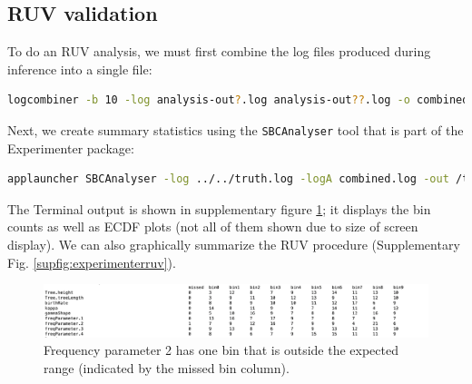 \documentclass[oneside]{article}
\begin{document}
\subsection{RUV validation}

To do an RUV analysis, we must first combine the log files produced during inference into a single file:

\vspace{.25cm}

{\scriptsize
\begin{lstlisting}[language=bash]
logcombiner -b 10 -log analysis-out?.log analysis-out??.log -o combined.log
\end{lstlisting}
}

Next, we create summary statistics using the \texttt{SBCAnalyser} tool that is part of the Experimenter package:

\vspace{.25cm}

{\scriptsize
\begin{lstlisting}[language=bash]
applauncher SBCAnalyser -log ../../truth.log -logA combined.log -out /tmp -bins 10
\end{lstlisting}
}

The Terminal output is shown in supplementary figure \ref{supfig:terminal2}; it displays the bin counts as well as ECDF plots (not all of them shown due to size of screen display).
We can also graphically summarize the RUV procedure (Supplementary Fig. \ref{supfig:experimenterruv}).

\begin{figure}
  \includegraphics[width=\textwidth]{../figures/sbscalculator0.png}
  \caption{Frequency parameter 2 has one bin that is outside the expected range (indicated by the missed bin column).}
  \label{supfig:terminal2}
\end{figure}
\end{document}
